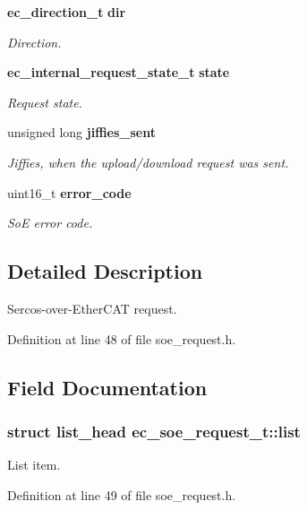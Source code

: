 \begin{DoxyCompactItemize}
{\bf ec\-\_\-direction\-\_\-t} {\bf dir}
\begin{DoxyCompactList}\small\item\em Direction. \end{DoxyCompactList}\item 
{\bf ec\-\_\-internal\-\_\-request\-\_\-state\-\_\-t} {\bf state}
\begin{DoxyCompactList}\small\item\em Request state. \end{DoxyCompactList}\item 
unsigned long {\bf jiffies\-\_\-sent}
\begin{DoxyCompactList}\small\item\em Jiffies, when the upload/download request was sent. \end{DoxyCompactList}\item 
uint16\-\_\-t {\bf error\-\_\-code}
\begin{DoxyCompactList}\small\item\em So\-E error code. \end{DoxyCompactList}\end{DoxyCompactItemize}


\subsection{Detailed Description}
Sercos-\/over-\/\-Ether\-C\-A\-T request. 

Definition at line 48 of file soe\-\_\-request.\-h.



\subsection{Field Documentation}
\subsubsection[{list}]{\setlength{\rightskip}{0pt plus 5cm}struct list\-\_\-head ec\-\_\-soe\-\_\-request\-\_\-t\-::list}\label{structec__soe__request__t_a07cafa8f400f95ced4f6037629c979f6}


List item. 



Definition at line 49 of file soe\-\_\-request.\-h.

